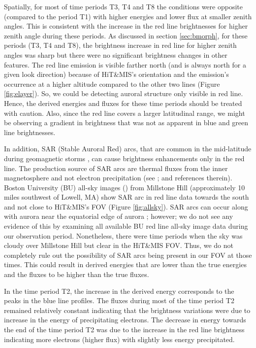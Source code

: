 Spatially, for most of time periods T3, T4 and T8 the conditions were opposite (compared to the period T1) with higher energies and lower flux at smaller zenith angles. This is consistent with the increase in the red line brightnesses for higher zenith angle during these periods. As discussed in section \ref{sec:bmorph}, for these periods (T3, T4 and T8), the brightness increase in red line for higher zenith angles was sharp but there were no significant brightness changes in other features. The red line emission is visible farther north (and is always north for a given look direction) because of HiT\&MIS's orientation and the emission's occurrence at a higher altitude compared to the other two lines (Figure \ref{fig:elayer}). So, we could be detecting auroral structure only visible in red line. Hence, the derived energies and fluxes for these time periods should be treated with caution. Also, since the red line covers a larger latitudinal range, we might be observing a gradient in brightness that was not as apparent in blue and green line brightnesses. 

In addition, SAR (Stable Auroral Red) arcs, that are common in the mid-latitude during geomagnetic storms \citep{mendillo_sar}, can cause brightness enhancements only in the red line. The production source of SAR arcs are thermal fluxes from the inner magnetosphere and not electron precipitation (see \cite{mendillo_sar}; \cite{kozyra_1997,rees_1975} and references therein). Boston University (BU) all-sky images (\cite{asi_1993}) from Millstone Hill (approximately 10 miles southwest of Lowell, MA) show SAR arc in red line data towards the south and not close to HiT\&MIS's FOV (Figure \ref{fig:allsky}). SAR arcs can occur along with aurora near the equatorial edge of aurora \citep{ievenko_2008}; however; we do not see any evidence of this by examining all available BU red line all-sky image data during our observation period. Nonetheless, there were time periods when the sky was cloudy over Millstone Hill but clear in the HiT\&MIS FOV. Thus, we do not completely rule out the possibility of SAR arcs being present in our FOV at those times. This could result in derived energies that are lower than the true energies and the fluxes to be higher than the true fluxes. 

In the time period T2, the increase in the derived energy corresponds to the peaks in the blue line profiles. The fluxes during most of the time period T2 remained relatively constant indicating that the brightness variations were due to increase in the energy of precipitating electrons. The decrease in energy towards the end of the time period T2 was due to the increase in the red line brightness indicating more electrons (higher flux) with slightly less energy precipitated. 

